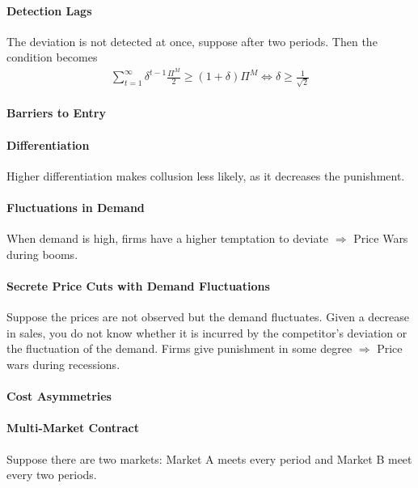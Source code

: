\documentclass[11pt]{elegantbook}
\begin{document}
\paragraph*{Detection Lags}
The deviation is not detected at once, suppose after two periods. Then the condition becomes
\begin{equation}
    \begin{aligned}
        \sum_{t=1}^\infty\delta^{t-1}\frac{\Pi^M}{2}\geq (1+\delta)\Pi^M
        \Leftrightarrow \delta\geq \frac{1}{\sqrt{2}}
    \end{aligned}
    \nonumber
\end{equation}

\paragraph*{Barriers to Entry}

\paragraph*{Differentiation} Higher differentiation makes collusion less likely, as it decreases the punishment.

\paragraph*{Fluctuations in Demand}
When demand is high, firms have a higher temptation to deviate $\Rightarrow$ Price Wars during booms.

\paragraph*{Secrete Price Cuts with Demand Fluctuations} Suppose the prices are not observed but the demand fluctuates. Given a decrease in sales, you do not know whether it is incurred by the competitor's deviation or the fluctuation of the demand. Firms give punishment in some degree $\Rightarrow$ Price wars during recessions.

\paragraph*{Cost Asymmetries}

\paragraph*{Multi-Market Contract}
Suppose there are two markets: Market A meets every period and Market B meet every two periods.
\end{document}
